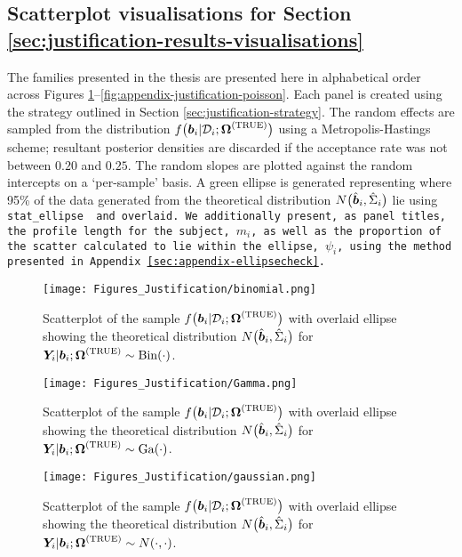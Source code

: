 \subsection{Scatterplot visualisations for Section \ref{sec:justification-results-visualisations}}\label{sec:appendix-suppfigs-justification-viz}
The families presented in the thesis are presented here in alphabetical order across Figures \ref{fig:appendix-justification-binomial}--\ref{fig:appendix-justification-poisson}. Each panel is created using the strategy outlined in Section \ref{sec:justification-strategy}. The random effects are sampled from the distribution $f\big(\bm{b}_i|\mathcal{D}_i;\bm{\mathrm{\Omega}}^{(\mathrm{TRUE})}\big)$ using a Metropolis-Hastings scheme; resultant posterior densities are discarded if the acceptance rate was not between $0.20$ and $0.25$. The random slopes are plotted against the random intercepts on a `per-sample' basis. A green ellipse is generated representing where 95\% of the data generated from the theoretical distribution $N\big(\hat{\bm{b}}_i,\hat{\Sigma}_i\big)$ lie using \tt{stat\_ellipse} \citep{R-ggplot2} and overlaid. We additionally present, as panel titles, the profile length for the subject, $m_i$, as well as the proportion of the scatter calculated to lie within the ellipse, $\psi_i$, using the method presented in Appendix \ref{sec:appendix-ellipsecheck}.
\thispagestyle{empty}
\begin{landscape}
\begin{figure}
    \centering
    \texttt{[image: Figures\_Justification/binomial.png]}
    \caption{Scatterplot of the sample $f\big(\bm{b}_i|\mathcal{D}_i;\bm{\mathrm{\Omega}}^{(\mathrm{TRUE})}\big)$ with overlaid ellipse showing the theoretical distribution $N\big(\hat{\bm{b}}_i,\hat{\Sigma}_i\big)$ for $\bm{Y}_i|\bm{b}_i;\bm{\mathrm{\Omega}}^{(\mathrm{TRUE})}\sim\mathrm{Bin}\!\left(\cdot\right)$.}
    \label{fig:appendix-justification-binomial}
\end{figure}
\vfill
\lscapepageno
\end{landscape}
\clearpage
\thispagestyle{empty}
\begin{landscape}
\begin{figure}
    \centering
    \texttt{[image: Figures\_Justification/Gamma.png]}
    \caption{Scatterplot of the sample $f\big(\bm{b}_i|\mathcal{D}_i;\bm{\mathrm{\Omega}}^{(\mathrm{TRUE})}\big)$ with overlaid ellipse showing the theoretical distribution $N\big(\hat{\bm{b}}_i,\hat{\Sigma}_i\big)$ for $\bm{Y}_i|\bm{b}_i;\bm{\mathrm{\Omega}}^{(\mathrm{TRUE})}\sim\mathrm{Ga}\!\left(\cdot\right)$.}
    \label{fig:appendix-justification-Gamma}
\end{figure}
\vfill
\lscapepageno
\end{landscape}
\clearpage
\thispagestyle{empty}
\begin{landscape}
\begin{figure}
    \centering
    \texttt{[image: Figures\_Justification/gaussian.png]}
    \caption{Scatterplot of the sample $f\big(\bm{b}_i|\mathcal{D}_i;\bm{\mathrm{\Omega}}^{(\mathrm{TRUE})}\big)$ with overlaid ellipse showing the theoretical distribution $N\big(\hat{\bm{b}}_i,\hat{\Sigma}_i\big)$ for $\bm{Y}_i|\bm{b}_i;\bm{\mathrm{\Omega}}^{(\mathrm{TRUE})}\sim N\!\left(\cdot,\cdot\right)$.}
    \label{fig:appendix-justification-gaussian}
\end{figure}
\vfill
\lscapepageno
\end{landscape}
